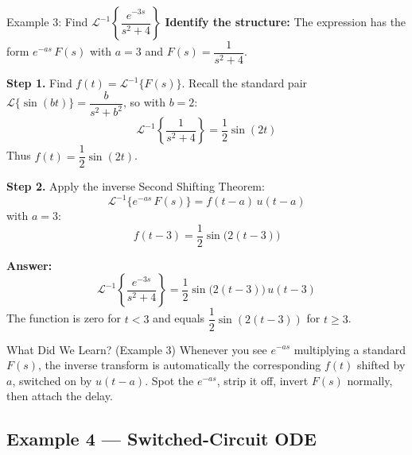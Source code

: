 \documentclass[12pt,a4paper]{article}
\begin{document}
\begin{infobox}{Example 3: Find $\mathcal{L}^{-1}\!\left\{\dfrac{e^{-3s}}{s^2+4}\right\}$}
\textbf{Identify the structure:} The expression has the form $e^{-as}\,F(s)$ with
$a = 3$ and $F(s) = \dfrac{1}{s^2 + 4}$.

\textbf{Step 1.} Find $f(t) = \mathcal{L}^{-1}\{F(s)\}$.
Recall the standard pair $\mathcal{L}\{\sin(bt)\} = \dfrac{b}{s^2+b^2}$, so with $b = 2$:
\[
  \mathcal{L}^{-1}\!\left\{\frac{1}{s^2+4}\right\} = \frac{1}{2}\sin(2t)
\]
Thus $f(t) = \dfrac{1}{2}\sin(2t)$.

\textbf{Step 2.} Apply the inverse Second Shifting Theorem:
\[
  \mathcal{L}^{-1}\{e^{-as}\,F(s)\} = f(t-a)\,u(t-a)
\]
with $a = 3$:
\[
  f(t-3) = \frac{1}{2}\sin\bigl(2(t-3)\bigr)
\]

\textbf{Answer:}
\[
  \boxed{\mathcal{L}^{-1}\!\left\{\frac{e^{-3s}}{s^2+4}\right\}
  = \frac{1}{2}\sin\bigl(2(t-3)\bigr)\,u(t-3)}
\]
The function is zero for $t < 3$ and equals $\dfrac{1}{2}\sin(2(t-3))$ for $t \geq 3$.
\end{infobox}

\begin{learnbox}{What Did We Learn? (Example 3)}
Whenever you see $e^{-as}$ multiplying a standard $F(s)$, the inverse transform is
automatically the corresponding $f(t)$ shifted by $a$, switched on by $u(t-a)$.
Spot the $e^{-as}$, strip it off, invert $F(s)$ normally, then attach the delay.
\end{learnbox}

\subsection*{Example 4 --- Switched-Circuit ODE}
\end{document}
